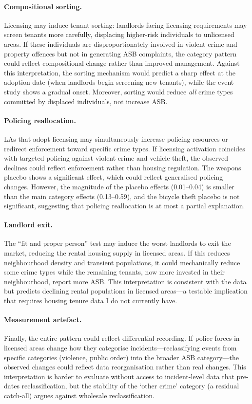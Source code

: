 \documentclass[12pt]{article}
\begin{document}
\paragraph{Compositional sorting.} Licensing may induce tenant sorting: landlords facing licensing requirements may screen tenants more carefully, displacing higher-risk individuals to unlicensed areas. If these individuals are disproportionately involved in violent crime and property offences but not in generating ASB complaints, the category pattern could reflect compositional change rather than improved management. Against this interpretation, the sorting mechanism would predict a sharp effect at the adoption date (when landlords begin screening new tenants), while the event study shows a gradual onset. Moreover, sorting would reduce \emph{all} crime types committed by displaced individuals, not increase ASB.

\paragraph{Policing reallocation.} LAs that adopt licensing may simultaneously increase policing resources or redirect enforcement toward specific crime types. If licensing activation coincides with targeted policing against violent crime and vehicle theft, the observed declines could reflect enforcement rather than housing regulation. The weapons placebo shows a significant effect, which could reflect generalised policing changes. However, the magnitude of the placebo effects (0.01--0.04) is smaller than the main category effects (0.13--0.59), and the bicycle theft placebo is not significant, suggesting that policing reallocation is at most a partial explanation.

\paragraph{Landlord exit.} The ``fit and proper person'' test may induce the worst landlords to exit the market, reducing the rental housing supply in licensed areas. If this reduces neighbourhood density and transient populations, it could mechanically reduce some crime types while the remaining tenants, now more invested in their neighbourhood, report more ASB. This interpretation is consistent with the data but predicts declining rental populations in licensed areas---a testable implication that requires housing tenure data I do not currently have.

\paragraph{Measurement artefact.} Finally, the entire pattern could reflect differential recording. If police forces in licensed areas change how they categorise incidents---reclassifying events from specific categories (violence, public order) into the broader ASB category---the observed changes could reflect data reorganisation rather than real changes. This interpretation is harder to evaluate without access to incident-level data that pre-dates reclassification, but the stability of the `other crime' category (a residual catch-all) argues against wholesale reclassification.
\end{document}
